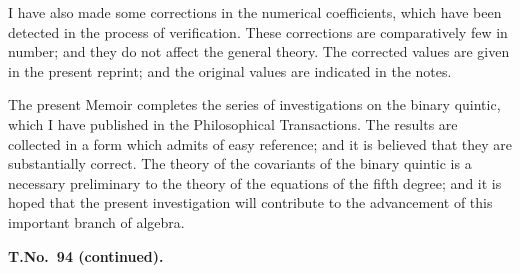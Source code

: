\documentclass[11pt,a4paper]{book}
\begin{document}
I have also made some corrections in the numerical coefficients, which have been detected in the process of verification. These corrections are comparatively few in number; and they do not affect the general theory. The corrected values are given in the present reprint; and the original values are indicated in the notes.

The present Memoir completes the series of investigations on the binary quintic, which I have published in the Philosophical Transactions. The results are collected in a form which admits of easy reference; and it is believed that they are substantially correct. The theory of the covariants of the binary quintic is a necessary preliminary to the theory of the equations of the fifth degree; and it is hoped that the present investigation will contribute to the advancement of this important branch of algebra.

\clearpage
\setcounter{page}{293}

\begin{center}
\textbf{T.\quad No.\ 94 (continued).}
\end{center}
\end{document}
